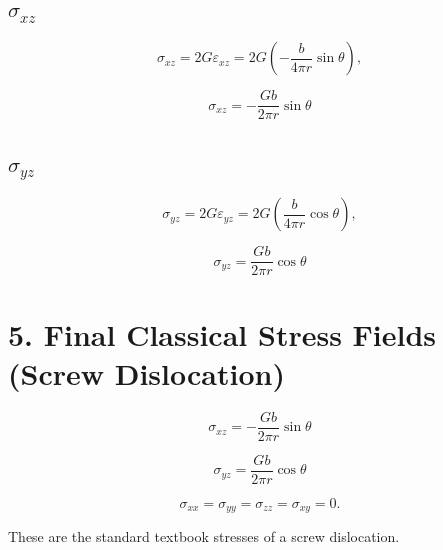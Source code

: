 \documentclass[12pt]{article}
\begin{document}
\subsection*{$\sigma_{xz}$}

\[
\sigma_{xz}
= 2G\varepsilon_{xz}
= 2G\left(-\frac{b}{4\pi r}\sin\theta\right),
\]

\[
\boxed{
\sigma_{xz}
= -\frac{Gb}{2\pi r}\sin\theta
}
\]

\subsection*{$\sigma_{yz}$}

\[
\sigma_{yz}
= 2G\varepsilon_{yz}
= 2G\left(\frac{b}{4\pi r}\cos\theta\right),
\]

\[
\boxed{
\sigma_{yz}
= \frac{Gb}{2\pi r}\cos\theta
}
\]


\section*{5. Final Classical Stress Fields (Screw Dislocation)}

\[
\boxed{
\sigma_{xz}
= -\frac{Gb}{2\pi r}\sin\theta
}
\]

\[
\boxed{
\sigma_{yz}
= \frac{Gb}{2\pi r}\cos\theta
}
\]

\[
\sigma_{xx}=\sigma_{yy}=\sigma_{zz}=\sigma_{xy}=0.
\]

These are the standard textbook stresses of a screw dislocation.
\end{document}
